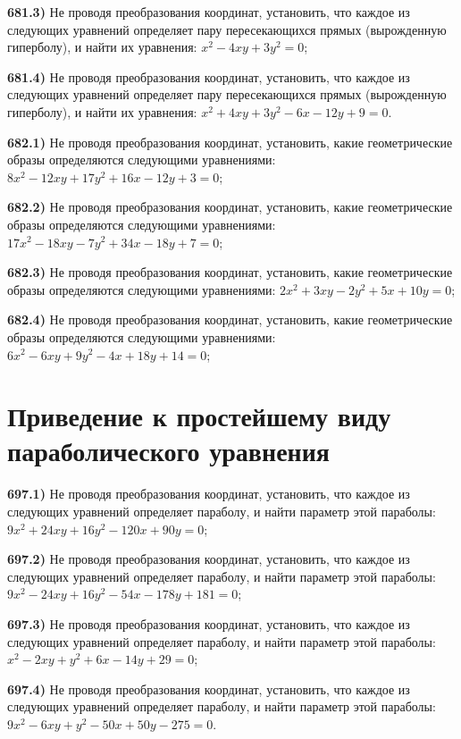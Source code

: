 \textbf{681.3)} Не проводя преобразования координат, установить, что каждое из следующих уравнений определяет пару пересекающихся прямых (вырожденную гиперболу), и найти их уравнения: $x^2-4 x y+3 y^2=0$;

\textbf{681.4)} Не проводя преобразования координат, установить, что каждое из следующих уравнений определяет пару пересекающихся прямых (вырожденную гиперболу), и найти их уравнения: $x^2+4 x y+3 y^2-6 x-12 y+9=0$.

\textbf{682.1)} Не проводя преобразования координат, установить, какие геометрические образы определяются следующими уравнениями: $8 x^2-12 x y+17 y^2+16 x-12 y+3=0$;

\textbf{682.2)} Не проводя преобразования координат, установить, какие геометрические образы определяются следующими уравнениями: $17 x^2-18 x y-7 y^2+34 x-18 y+7=0$;

\textbf{682.3)} Не проводя преобразования координат, установить, какие геометрические образы определяются следующими уравнениями: $2 x^2+3 x y-2 y^2+5 x+10 y=0$;

\textbf{682.4)} Не проводя преобразования координат, установить, какие геометрические образы определяются следующими уравнениями: $6 x^2-6 x y+9 y^2-4 x+18 y+14=0$;



\section{Приведение к простейшему виду параболического уравнения}



\textbf{697.1)} Не проводя преобразования координат, установить, что каждое из следующих уравнений определяет параболу, и найти параметр этой параболы: $9 x^2+24 x y+16 y^2-120 x+90 y=0$;

\textbf{697.2)} Не проводя преобразования координат, установить, что каждое из следующих уравнений определяет параболу, и найти параметр этой параболы: $9 x^2-24 x y+16 y^2-54 x-178 y+181=0$;

\textbf{697.3)} Не проводя преобразования координат, установить, что каждое из следующих уравнений определяет параболу, и найти параметр этой параболы: $x^2-2 x y+y^2+6 x-14 y+29=0$;

\textbf{697.4)} Не проводя преобразования координат, установить, что каждое из следующих уравнений определяет параболу, и найти параметр этой параболы: $9 x^2-6 x y+y^2-50 x+50 y-275=0$.



